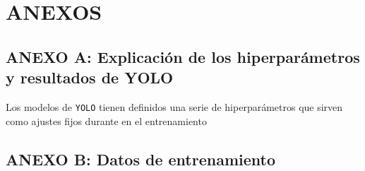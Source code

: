\section{ANEXOS}
\subsection*{ANEXO A: Explicación de los hiperparámetros y resultados de YOLO}
\label{subsec:A}

Los modelos de \texttt{YOLO} tienen definidos una serie de hiperparámetros que sirven como ajustes fijos durante en el entrenamiento


\subsection*{ANEXO B: Datos de entrenamiento}
\label{subsec:B}